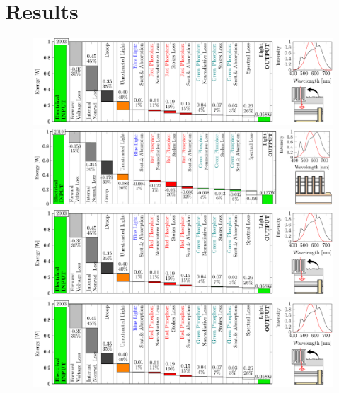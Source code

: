 \documentclass[twoside,twocolumn,9pt]{article}
\begin{document}
\section{Results}

\begin{figure}[h!]
 \centering
 \includegraphics[width=17cm]{2_SSL_EES/article/figures/waterfall_performance_2003.pdf}
 \includegraphics[width=17cm]{2_SSL_EES/article/figures/waterfall_performance_2010.pdf}
 \includegraphics[width=17cm]{2_SSL_EES/article/figures/waterfall_performance_2003.pdf}
 \includegraphics[width=17cm]{2_SSL_EES/article/figures/waterfall_performance_2003.pdf}

\end{figure}
\end{document}
